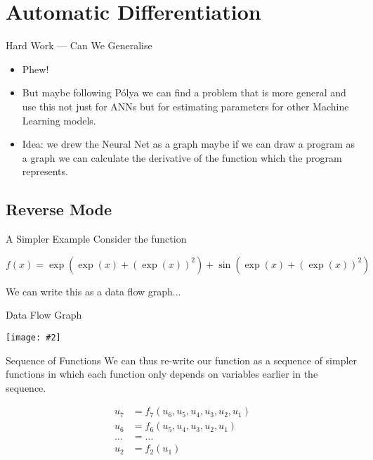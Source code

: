\documentclass{beamer}
\newcommand {\framedgraphic}[2] {
    \begin{frame}{#1}
        \begin{center}
            \texttt{[image: \#2]}
        \end{center}
    \end{frame}
}
\begin{document}
\section{Automatic Differentiation}

\begin{frame}[fragile]{Hard Work --- Can We Generalise}
\begin{itemize}
\item
Phew!
\item
But maybe following P\'{o}lya we can find a problem that is more
general and use this not just for ANNs but for estimating parameters
for other Machine Learning models.
\item
Idea: we drew the Neural Net as a graph maybe if we can draw a program as a
graph we can calculate the derivative of the function which the
program represents.
\end{itemize}
\end{frame}

\subsection{Reverse Mode}

\begin{frame}[fragile]{A Simpler Example}
Consider the function

$$
f(x) = \exp(\exp(x) + (\exp(x))^2) + \sin(\exp(x) + (\exp(x))^2)
$$

We can write this as a data flow graph...
\end{frame}

\framedgraphic{Data Flow Graph}{diagrams/02c0671aa558b88e5ed6f195b22bbd8a.png}

\begin{frame}[fragile]{Sequence of Functions}
We can thus re-write our function as a sequence of simpler functions
in which each function only depends on variables earlier in the
sequence.

$$
\begin{aligned}
u_7    &= f_7(u_6, u_5, u_4, u_3, u_2, u_1) \\
u_6    &= f_6(u_5, u_4, u_3, u_2, u_1) \\
\ldots &= \ldots \\
u_2    &= f_2(u_1)
\end{aligned}
$$
\end{frame}
\end{document}
